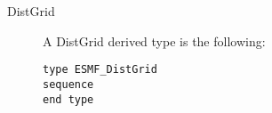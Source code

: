 

\begin{description}

\item [DistGrid] A DistGrid derived type is the following:
\begin{verbatim}
type ESMF_DistGrid
sequence
end type
\end{verbatim}


\end{description}



